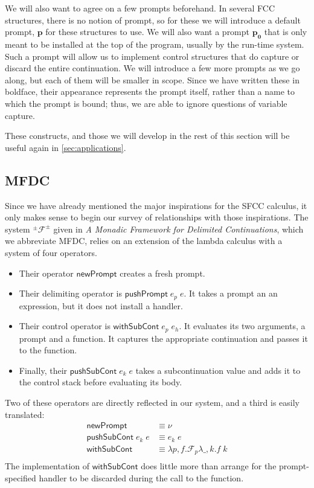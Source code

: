 \documentclass[11pt]{article}
\newcommand{\maybePage}{\newpage}
\newcommand\F{\mathcal{F}}
\newcommand\pmFpm{^\pm\F^\pm}
\begin{document}
We will also want to agree on a few prompts beforehand.
In several FCC structures, there is no notion of prompt, so for these we will introduce a default prompt, $\mathbf{p}$ for these structures to use.
We will also want a prompt $\mathbf{p_0}$ that is only meant to be installed at the top of the program, usually by the run-time system.
Such a prompt will allow us to implement control structures that do capture or discard the entire continuation.
We will introduce a few more prompts as we go along, but each of them will be smaller in scope.
Since we have written these in boldface, their appearance represents the prompt itself, rather than a name to which the prompt is bound; thus, we are able to ignore questions of variable capture.

These constructs, and those we will develop in the rest of this section will be useful again in \ref{sec:applications}.

\maybePage
\subsection{MFDC}

Since we have already mentioned the major inspirations for the SFCC calculus, it only makes sense to begin our survey of relationships with those inspirations.
The system $\pmFpm$ given in \textit{A Monadic Framework for Delimited Continuations}\cite{MFDC}, which we abbreviate MFDC, relies on an extension of the lambda calculus with a system of four operators.

\begin{itemize}
\item Their operator $\mathsf{newPrompt}$ creates a fresh prompt.
\item Their delimiting operator is $\mathsf{pushPrompt}\;e_p\;e$.
It takes a prompt an an expression, but it does not install a handler.
\item Their control operator is $\mathsf{withSubCont}\;e_p\;e_h$.
It evaluates its two arguments, a prompt and a function.
It captures the appropriate continuation and passes it to the function.
\item Finally, their $\mathsf{pushSubCont}\;e_k\;e$ takes a subcontinuation value and adds it to the control stack before evaluating its body.
\end{itemize}

Two of these operators are directly reflected in our system, and a third is easily translated:
\begin{align*}
\mathsf{newPrompt} &\equiv \nu \\
\mathsf{pushSubCont}\;e_k\;e &\equiv e_k\;e \\
\mathsf{withSubCont} &\equiv
    \lambda p,f. \F_{p}\lambda \_,k. f\;k \\
\end{align*}
The implementation of $\mathsf{withSubCont}$ does little more than arrange for the prompt-specified handler to be discarded during the call to the function.
\end{document}
